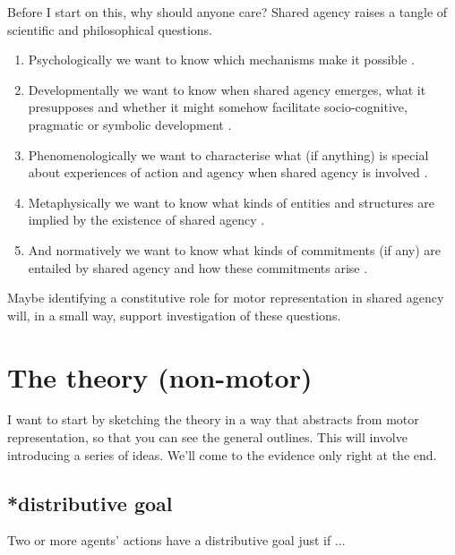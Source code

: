 \documentclass[12pt,\papersize]{extarticle}
\begin{document}
Before I start on this,
why should anyone care?
Shared agency raises a tangle of scientific and philosophical questions.  
%
\begin{enumerate}
\item Psychologically we want to know which mechanisms make it possible \citep{Sebanz:2006yq,vesper_minimal_2010}.  
\item Developmentally we want to know when shared agency emerges, what it presupposes and whether it might somehow facilitate socio-cognitive, pragmatic or symbolic development \citep{Moll:2007gu,Hughes:2004zj,Brownell:2006gu}.  
\item Phenomenologically we want to characterise what (if anything) is special about experiences of action and agency when shared agency is involved \citep{Pacherie:2010fk}.  
\item Metaphysically we want to know what kinds of entities and structures are implied by the existence of shared agency \citep{Gilbert:1992rs,Searle:1994lb}.  
\item And normatively we want to know what kinds of commitments (if any) are entailed by shared agency and how these commitments arise \citep{Roth:2004ki}.
\end{enumerate}
%
Maybe identifying a constitutive role for motor representation in shared agency will, in a small way,
 support investigation of these questions.  



\section{The theory (non-motor)}
I want to start by sketching the theory in a way that abstracts from motor representation,
  so that you can see the general outlines.
  This will involve introducing a series of ideas.  
We'll come to the evidence only right at the end.



\subsection{*distributive goal}
Two or more agents' actions have a distributive goal just if ...
\end{document}
